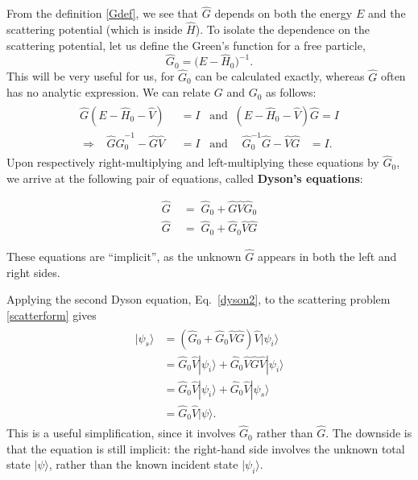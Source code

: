 \documentclass[pra,12pt]{revtex4}
\begin{document}
From the definition \eqref{Gdef}, we see that $\hat{G}$ depends on
both the energy $E$ and the scattering potential (which is inside
$\hat{H}$).  To isolate the dependence on the scattering potential,
let us define the Green's function for a free particle,
\begin{equation}
  \hat{G}_0=\big(E-\hat{H}_0\big)^{-1}.
  \label{G0unregulated}
\end{equation}
This will be very useful for us, for $\hat{G}_0$ can be calculated
exactly, whereas $\hat{G}$ often has no analytic expression.  We can
relate $G$ and $G_0$ as follows:
\begin{align}
  \begin{aligned}
    \hat{G}(E-\hat{H}_0 - \hat{V})\;\; &= I \;\;\;\mathrm{and}\;\; (E-\hat{H}_0 - \hat{V})\hat{G} = I \\ \Rightarrow \;\;\; \hat{G} \hat{G}_0^{-1} - \hat{G}\hat{V} &= I \;\;\; \mathrm{and}\;\;\;\;\, \hat{G}_0^{-1} \hat{G} - \hat{V}\hat{G} \;\;\;= I.
  \end{aligned}
\end{align}
Upon respectively right-multiplying and left-multiplying these equations
by $\hat{G}_0$, we arrive at the following pair of equations, called
\textbf{Dyson's equations}:
\begin{framed}
  \begin{align}
    \hat{G} \;&= \; \hat{G}_0 + \hat{G}\hat{V}\hat{G}_0 \\
    \hat{G} \;&=\; \hat{G}_0 + \hat{G}_0\hat{V}\hat{G} \label{dyson2}
  \end{align}
\end{framed}
\noindent
These equations are ``implicit'', as the unknown $\hat{G}$ appears in
both the left and right sides.

Applying the second Dyson equation, Eq.~\eqref{dyson2}, to the
scattering problem \eqref{scatterform} gives
\begin{align}
  \begin{aligned}|\psi_s\rangle &= \left(\hat{G}_0 + \hat{G}_0\hat{V}\hat{G}\right) \hat{V} |\psi_i\rangle \\ &= \hat{G}_0 \hat{V} |\psi_i\rangle + \hat{G}_0\hat{V}\hat{G} \hat{V} |\psi_i\rangle \\ &= \hat{G}_0 \hat{V} |\psi_i\rangle + \hat{G}_0\hat{V} |\psi_s\rangle \\ &= \hat{G}_0\hat{V} |\psi\rangle.\end{aligned}
  \label{psis_implicity}
\end{align}
This is a useful simplification, since it involves $\hat{G}_0$ rather
than $\hat{G}$.  The downside is that the equation is still implicit:
the right-hand side involves the unknown total state $|\psi\rangle$,
rather than the known incident state $|\psi_i\rangle$.
\end{document}
